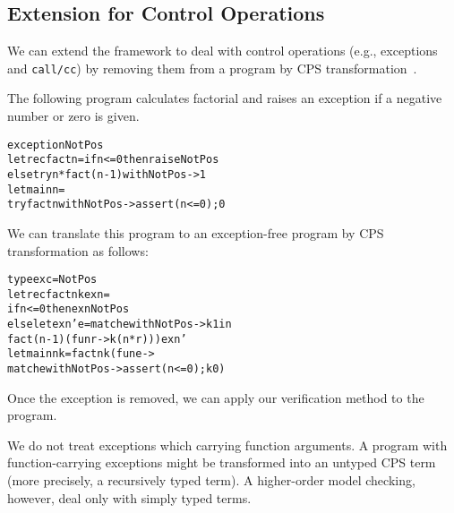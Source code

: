 \vspace{-2pt}
\subsection{Extension for Control Operations}
\label{sec:control} We can extend the framework to deal with control
operations (e.g., exceptions and \texttt{call/cc}) by removing them
from a program by CPS transformation~\cite{Nielsen2001}.

The following program calculates factorial and raises an exception if
a negative number or zero is given.
\vspace{-5pt}
\begin{alltt}
 exception NotPos
 letrec fact n = if n <= 0 then raise NotPos
   else try n * fact (n - 1) with NotPos -> 1
 let main n =
   try fact n with NotPos -> assert (n <= 0); 0
\end{alltt}
\vspace{-5pt}
We can translate this program to an exception-free program by CPS transformation as follows:
\vspace{-5pt}
\begin{alltt}
 type exc = NotPos
 letrec fact n k exn =
   if n <= 0 then exn NotPos
   else let exn' e = match e with NotPos -> k 1 in
          fact (n - 1) (fun r -> k (n * r))) exn'
 let main n k = fact n k (fun e ->
   match e with NotPos -> assert (n <= 0); k 0)
\end{alltt}
\vspace{-5pt}
Once the exception is removed, we can apply our verification method to the
program.

We do not treat exceptions which carrying function arguments.
A program with function-carrying exceptions might be transformed into an
untyped CPS term (more precisely, a recursively typed term).  A
higher-order model checking, however, deal only with simply typed terms.
